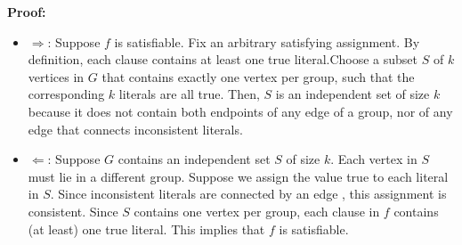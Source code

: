 \textbf{Proof:}
\begin{itemize}
    \item $\Rightarrow$: Suppose $f$ is satisfiable.  Fix an arbitrary satisfying assignment. By definition, each clause contains at least one true literal.Choose a subset $S$ of $k$ vertices in $G$ that contains exactly one vertex per group, such that the corresponding $k$ literals are all true. Then, $S$ is an independent set of size $k$ because it does not contain both endpoints of any edge of a group, nor of any edge that connects inconsistent literals.

    \item $\Leftarrow$: Suppose $G$ contains an independent set $S$ of size $k$. Each vertex in $S$ must lie in a different group. Suppose we assign the value true to each literal in $S$. Since inconsistent literals are connected by an edge , this assignment is consistent. Since $S$ contains one vertex per group, each clause in $f$ contains (at least) one true literal. This implies that $f$ is satisfiable.
\end{itemize}

